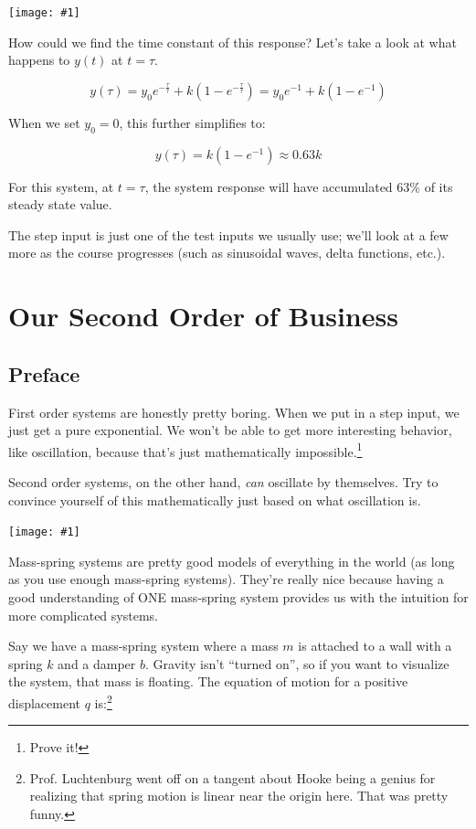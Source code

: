 \documentclass{report}
\newcommand{\bicture}[1]{
\begin{center}
    {\texttt{[image: \#1]}}
\end{center}}
\begin{document}
\begin{onehalfspacing}
\begin{flushleft}
\bicture{2_step}

How could we find the time constant of this response? Let's take a look at what happens to \(y(t)\) at \(t=\tau\).

\vspace{-0.1in}
\[y(\tau) = y_0 e^{-\frac{\tau}{\tau}} + k(1-e^{-\frac{\tau}{\tau}})= y_0 e^{-1} + k(1-e^{-1})\]

When we set \(y_0 = 0\), this further simplifies to:

\vspace{-0.1in}
\[y(\tau) = k(1-e^{-1}) \approx 0.63 k\]

For this system, at \(t=\tau\), the system response will have accumulated 63\% of its steady state value.

\medskip

The step input is just one of the test inputs we usually use; we'll look at a few more as the course progresses (such as sinusoidal waves, delta functions, etc.).

\chapter{Our Second Order of Business}

\section*{Preface}

First order systems are honestly pretty boring. When we put in a step input, we just get a pure exponential. We won't be able to get more interesting behavior, like oscillation, because that's just mathematically impossible.\footnote{Prove it!}

\medskip

Second order systems, on the other hand, \textit{can} oscillate by themselves. Try to convince yourself of this mathematically just based on what oscillation is.

\bicture{2_unf}

Mass-spring systems are pretty good models of everything in the world (as long as you use enough mass-spring systems). They're really nice because having a good understanding of ONE mass-spring system provides us with the intuition for more complicated systems. 

\medskip

Say we have a mass-spring system where a mass \(m\) is attached to a wall with a spring \(k\) and a damper \(b\). Gravity isn't ``turned on'', so if you want to visualize the system, that mass is floating. The equation of motion for a positive displacement \(q\) is:\footnote{Prof. Luchtenburg went off on a tangent about Hooke being a genius for realizing that spring motion is linear near the origin here. That was pretty funny.}


\end{flushleft}
\end{onehalfspacing}
\end{document}
